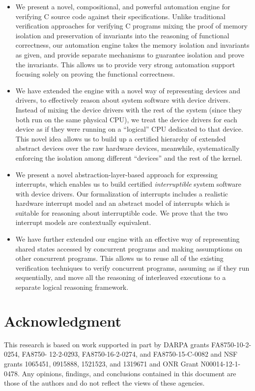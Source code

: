 \begin{itemize}
\item We present a novel, compositional, and powerful automation engine
for verifying C source code against their specifications. Unlike traditional
verification approaches for verifying C programs mixing the proof of memory isolation
and preservation of invariants into the reasoning of functional correctness,
our automation engine takes the memory isolation and invariants as given, and provide
separate mechanisms to guarantee isolation and prove the invariants.
This allows us to provide very strong automation support focusing solely on
proving the functional correctness.


\item We have extended the engine with a novel way of representing
devices and drivers, to effectively reason about system software
with device drivers.
Instead of mixing the device drivers
  with the rest of the system (since they both run on the same
  physical CPU), we treat the device drivers for each device as if
  they were running on a ``logical'' CPU dedicated to that device.
  This novel idea allows us to build up a certified hierarchy of
  extended abstract devices over the raw hardware devices, meanwhile,
  systematically enforcing the isolation among different ``devices''
  and the rest of the kernel.

\item We present a novel abstraction-layer-based approach for
  expressing interrupts, which enables us to build certified
  {\em interruptible} system software with device drivers. Our formalization of
  interrupts includes a realistic hardware interrupt model and an
  abstract model of interrupts which is suitable for reasoning about
  interruptible code. We prove that the two interrupt models are
  contextually equivalent.
  
\item We have further extended our engine with an effective way of representing
shared states accessed by concurrent programs and making assumptions
on other concurrent programs. This allows us to reuse all of the
existing verification techniques to verify concurrent programs, assuming as if
they run sequentially, and move all the reasoning of interleaved executions
to a separate logical reasoning framework.  

  
\end{itemize}

\section{Acknowledgment}

This research is based on work
supported in part by DARPA grants FA8750-10-2-0254, FA8750-
12-2-0293, FA8750-16-2-0274, and FA8750-15-C-0082 and NSF grants 1065451, 0915888, 1521523, and 1319671 and ONR Grant
N00014-12-1-0478. 
Any opinions, findings,
and conclusions contained in this document are those of the authors
and do not reflect the views of these agencies.

